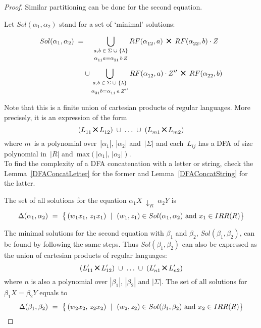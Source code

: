 \documentclass{lmcs} %
\theoremstyle{plain}\newtheorem{satz}[thm]{Satz} %
\newcommand{\Cross}{\mathbin{\tikz [x=1.4ex,y=1.4ex,line width=.2ex] \draw (0,0) -- (1,1) (0,1) -- (1,0);}}%
\begin{document}
\begin{proof}
Similar partitioning can be done for the second equation. 

Let $Sol(\alpha_1, \alpha_2)$ stand for a set of `minimal' solutions:

\begin{equation*}
\begin{aligned}
Sol(\alpha_1, \alpha_2) \; = & \; \; \; \; \,
 \bigcup_{\substack{a,b \; \in \; \Sigma \; \cup \; \{\lambda\} \\[+3pt] {\alpha_{11}^{} a} = {\alpha_{21}^{}}\,b\,Z}} RF({\alpha_{12}^{}}, a) \; \Cross \; RF({\alpha_{22}^{}}, b) \cdot Z \; \\[+5pt]
 & \cup 
\bigcup_{\substack{a,b \; \in \; \Sigma \; \cup \; \{\lambda\} \\[+3pt] {\alpha_{21}^{} b} = {\alpha_{11}^{}}\,a\,Z''}} RF({\alpha_{12}^{}}, a) \cdot Z'' \; \Cross \; RF({\alpha_{22}^{}}, b) \\
\end{aligned}
\end{equation*}

\noindent
Note that this is a finite union of cartesian products of regular languages. More precisely,
it is an expression of the form \[
(L_{11}^{} \Cross L_{12}^{}) \; \cup \; \ldots \; \cup \; 
(L_{m1}^{} \Cross L_{m2}^{}) \] where $m$~is a polynomial over~$| \alpha_1^{} |$,
$| \alpha_2^{} |$ and~$| \Sigma |$ and each~$L_{ij}^{}$ has a DFA of size
polynomial in~$|R|$ and~$\text{max}( |\alpha_1|, \, |\alpha_2|)$.\\
To find the complexity of a DFA concatenation with a letter or string, 
check the Lemma~\ref{DFAConcatLetter} for the former and Lemma~\ref{DFAConcatString} for the latter.

\noindent
The set of all solutions for the equation $\alpha_1^{} X \; \downarrow_R^{} \;
\alpha_2^{} Y$ is \[
\Delta(\alpha_1, \alpha_2) ~ = ~ \left\{ \vphantom{b^b} \, (w_1 x_1, \, z_1 x_1) ~ \; | \; ~ 
(w_1, z_1) \in Sol(\alpha_1, \alpha_2) \text{ and }
x_1 \in IRR(R) \right\} \]

The minimal solutions for the second
equation with $\beta_1$ and $\beta_2$, $Sol(\beta_1 , \beta_2)$, 
can be found by following the
same steps.  Thus $Sol(\beta_1 , \beta_2)$ can also be expressed
as 
the union of cartesian products of regular languages:  \[
(L_{11}^{\prime} \Cross L_{12}^{\prime}) \; \cup \; \ldots \; \cup \; 
(L_{n1}^{\prime} \Cross L_{n2}^{\prime}) \] where 
$n$ is also a polynomial over $|\beta_1|$, $|\beta_2|$ and $|\Sigma|$.
The set of all solutions for $\beta_1 X = \beta_2 Y$ equals to \[
\Delta(\beta_1, \beta_2) ~ = ~ \left\{ \vphantom{b^b} \, (w_2 x_2, \, z_2 x_2) ~ \; | \; ~ 
(w_2, z_2) \in Sol(\beta_1, \beta_2) \text{ and }
x_2 \in IRR(R) \right\} \]


\end{proof}
\end{document}

